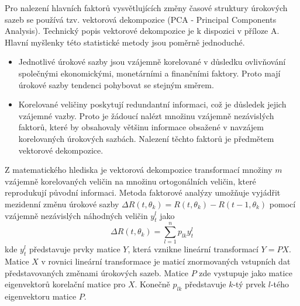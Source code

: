 \documentclass[a4paper]{book}
\begin{document}
Pro nalezení hlavních faktorů vysvětlujících změny časové struktury úrokových sazeb se používá tzv. vektorová dekompozice (PCA - Principal Components Analysis). Technický popis vektorové dekompozice je k dispozici v příloze A. Hlavní myšlenky této statistické metody jsou poměrně jednoduché.
\begin{itemize}
\item Jednotlivé úrokové sazby jsou vzájemně korelované v důsledku ovlivňování společnými ekonomickými, monetárními a finančními faktory. Proto mají úrokové sazby tendenci pohybovat se stejným směrem.
\item Korelované veličiny poskytují redundantní informaci, což je důsledek jejich vzájemné vazby. Proto je žádoucí nalézt množinu vzájemně nezávislých faktorů, které by obsahovaly většinu informace obsažené v navzájem korelovaných úrokových sazbách. Nalezení těchto faktorů je předmětem vektorové dekompozice.
\end{itemize}
Z matematického hlediska je vektorová dekompozice transformací množiny $m$ vzájemně korelovaných veličin na množinu ortogonálních veličin, které reprodukují původní informaci. Metoda faktorové analýzy umožňuje vyjádřit mezidenní změnu úrokové sazby $\Delta R(t,\theta_k) = R(t,\theta_k) - R(t - 1,\theta_k)$ pomocí vzájemně nezávislých náhodných veličin $y_t^l$ jako
\begin{equation*}
\Delta R(t, \theta_k) = \sum_{l = 1}^n p_{lk}y_t^l
\end{equation*}
kde $y_t^l$ představuje prvky matice $Y$, která vznikne lineární transformací $Y = PX$. Matice $X$ v rovnici lineární transformace je maticí znormovaných vstupních dat představovaných změnami úrokových sazeb. Matice $P$ zde vystupuje jako matice eigenvektorů korelační matice pro $X$. Konečně $p_{lk}$ představuje $k$-tý prvek $l$-tého eigenvektoru matice $P$. 
\end{document}
